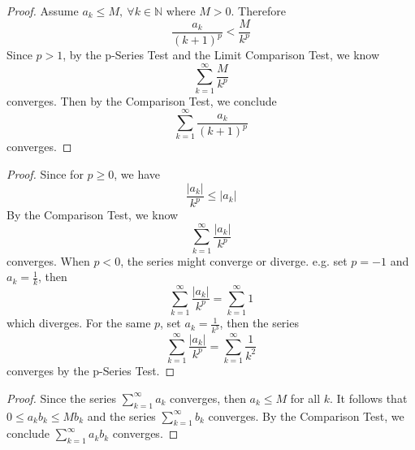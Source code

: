 \documentclass{report}
\begin{document}
\vspace{12pt}
\begin{Exercise}
\begin{proof}
Assume $a_k \leq M,\ \forall k \in \mathbb{N} $ where $M > 0$. Therefore $$ \frac{a_k}{(k+1)^p} < \frac{M}{k^p} $$
Since $p>1$, by the p-Series Test and the Limit Comparison Test, we know $$\sum_{k=1}^{\infty}\frac{M}{k^p}$$ converges. Then by the Comparison Test, we conclude $$\sum_{k=1}^{\infty}\frac{a_k}{(k+1)^p}$$ converges.
\end{proof}
\end{Exercise}

\setcounter{Exercise}{4}
\vspace{12pt}
\begin{Exercise}
\begin{proof}
Since for $p \geq 0$, we have $$\frac{|a_k|}{k^p} \leq |a_k|$$
By the Comparison Test, we know $$\sum_{k=1}^{\infty}\frac{|a_k|}{k^p}$$
converges. When $p < 0$, the series might converge or diverge. e.g. set $p=-1$ and $a_k=\frac{1}{k}$, then $$\sum_{k=1}^{\infty}\frac{|a_k|}{k^p} = \sum_{k=1}^{\infty}1$$ which diverges. For the same $p$, set $a_k = \frac{1}{k^3}$, then the series $$\sum_{k=1}^{\infty}\frac{|a_k|}{k^p} = \sum_{k=1}^{\infty}\frac{1}{k^2}$$ converges by the p-Series Test.
\end{proof}
\end{Exercise}

\setcounter{Exercise}{6}
\vspace{12pt}
\begin{Exercise}
\begin{proof}
Since the series $\sum_{k=1}^{\infty}a_k$ converges, then $a_k \leq M$ for all $k$. It follows that $0 \leq a_kb_k \leq Mb_k$ and the series  $\sum_{k=1}^{\infty}b_k$ converges. By the Comparison Test, we conclude $\sum_{k=1}^{\infty}a_kb_k$ converges.
\end{proof}
\end{Exercise}
\end{document}
